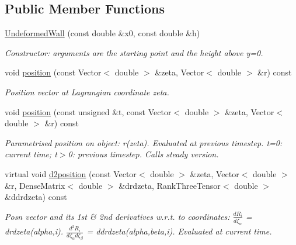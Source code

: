 \subsection*{Public Member Functions}
\begin{DoxyCompactItemize}
\item 
\hyperlink{classUndeformedWall_ad09cfdcd234be0ab47eb97a8a470602a}{Undeformed\+Wall} (const double \&x0, const double \&h)
\begin{DoxyCompactList}\small\item\em Constructor\+: arguments are the starting point and the height above y=0. \end{DoxyCompactList}\item 
void \hyperlink{classUndeformedWall_ab0410681e2096091319a79e79937cba3}{position} (const Vector$<$ double $>$ \&zeta, Vector$<$ double $>$ \&r) const
\begin{DoxyCompactList}\small\item\em Position vector at Lagrangian coordinate zeta. \end{DoxyCompactList}\item 
void \hyperlink{classUndeformedWall_a9cbb52e30fd47d1841c1c3dc812f4b96}{position} (const unsigned \&t, const Vector$<$ double $>$ \&zeta, Vector$<$ double $>$ \&r) const
\begin{DoxyCompactList}\small\item\em Parametrised position on object\+: r(zeta). Evaluated at previous timestep. t=0\+: current time; t$>$0\+: previous timestep. Calls steady version. \end{DoxyCompactList}\item 
virtual void \hyperlink{classUndeformedWall_a709e65fc95e9443a886125e455595e5d}{d2position} (const Vector$<$ double $>$ \&zeta, Vector$<$ double $>$ \&r, Dense\+Matrix$<$ double $>$ \&drdzeta, Rank\+Three\+Tensor$<$ double $>$ \&ddrdzeta) const
\begin{DoxyCompactList}\small\item\em Posn vector and its 1st \& 2nd derivatives w.\+r.\+t. to coordinates\+: $ \frac{dR_i}{d \zeta_\alpha}$ = drdzeta(alpha,i). $ \frac{d^2R_i}{d \zeta_\alpha d \zeta_\beta}$ = ddrdzeta(alpha,beta,i). Evaluated at current time. \end{DoxyCompactList}\end{DoxyCompactItemize}
